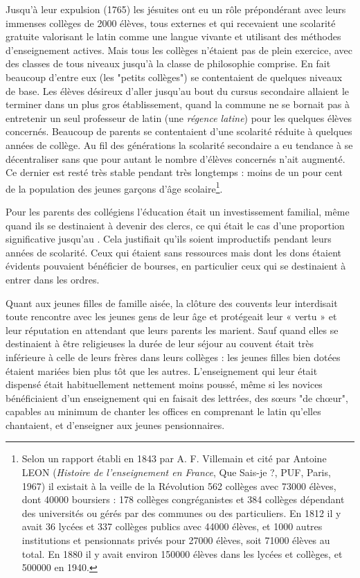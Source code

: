 Jusqu'à leur expulsion (1765) les jésuites ont eu un rôle prépondérant avec leurs immenses collèges de 2000 élèves, tous externes et qui recevaient une scolarité gratuite valorisant le latin comme une langue vivante et utilisant des méthodes d'enseignement actives. Mais tous les collèges n'étaient pas de plein exercice, avec des classes de tous niveaux jusqu'à la classe de philosophie comprise. En fait beaucoup d'entre eux (les "petits collèges") se contentaient de quelques niveaux de base. Les élèves désireux d'aller jusqu'au bout du cursus secondaire allaient le terminer dans un plus gros établissement, quand la commune ne se bornait pas à entretenir un seul professeur de latin (une \emph{régence latine}) pour les quelques élèves concernés. Beaucoup de parents se contentaient d'une scolarité réduite à quelques années de collège. Au fil des générations la scolarité secondaire a eu tendance à se décentraliser sans que pour autant le nombre d'élèves concernés n'ait augmenté. Ce dernier est resté très stable pendant très longtemps : moins de un pour cent de la population des jeunes garçons d'âge scolaire\footnote{Selon un rapport établi en 1843 par A. F. Villemain  et cité par Antoine LEON (\emph{Histoire de l'enseignement en France}, Que Sais-je ?, PUF, Paris, 1967) il existait à la veille de la Révolution 562 collèges avec 73000 élèves, dont 40000 boursiers : 178 collèges congréganistes et 384 collèges dépendant des universités ou gérés par des communes ou des particuliers. En 1812 il y avait 36 lycées et 337 collèges publics avec 44000 élèves, et 1000 autres institutions et pensionnats privés pour 27000 élèves, soit 71000 élèves au total. En 1880 il y avait environ 150000 élèves dans les lycées et collèges, et 500000 en 1940.}. 
 
 Pour les parents des collégiens l'éducation était un investissement familial, même quand ils se destinaient à devenir des clercs, ce qui était le cas d'une proportion significative jusqu'au . Cela justifiait qu'ils soient improductifs pendant leurs années de scolarité. Ceux qui étaient sans ressources mais dont les dons étaient évidents pouvaient bénéficier de bourses, en particulier ceux qui se destinaient à entrer dans les ordres.




Quant aux jeunes filles de famille aisée, la clôture des couvents leur interdisait toute rencontre avec les jeunes gens de leur âge et protégeait leur « vertu » et leur réputation en attendant que leurs parents les marient. Sauf quand elles se destinaient à être religieuses la durée de leur séjour au couvent était très inférieure à celle de leurs frères dans leurs collèges : les jeunes filles bien dotées étaient mariées bien plus tôt que les autres. L'enseignement qui leur était dispensé était habituellement nettement moins poussé, même si les novices bénéficiaient d'un enseignement qui en faisait des lettrées, des sœurs "de chœur", capables au minimum de chanter les offices en comprenant le latin qu'elles chantaient, et d'enseigner aux jeunes pensionnaires.

